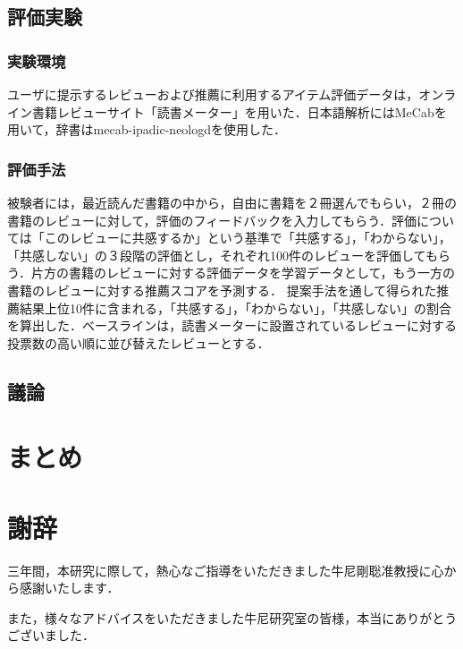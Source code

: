 \documentclass[a4paper,11pt,oneside,openany]{jsbook}
\begin{document}
	\section{評価実験}
		\subsection{実験環境}
ユーザに提示するレビューおよび推薦に利用するアイテム評価データは，オンライン書籍レビューサイト「読書メーター」を用いた．日本語解析にはMeCab\cite{mecab}を用いて，辞書はmecab-ipadic-neologd\cite{mecabdic}を使用した．

		\subsection{評価手法}
被験者には，最近読んだ書籍の中から，自由に書籍を２冊選んでもらい，２冊の書籍のレビューに対して，評価のフィードバックを入力してもらう．評価については「このレビューに共感するか」という基準で「共感する」，「わからない」，「共感しない」の３段階の評価とし，それぞれ100件のレビューを評価してもらう．片方の書籍のレビューに対する評価データを学習データとして，もう一方の書籍のレビューに対する推薦スコアを予測する．
提案手法を通して得られた推薦結果上位10件に含まれる，「共感する」，「わからない」，「共感しない」の割合を算出した．ベースラインは，読書メーターに設置されているレビューに対する投票数の高い順に並び替えたレビューとする．
	\section{議論}

\chapter{まとめ}

\chapter*{謝辞}
三年間，本研究に際して，熱心なご指導をいただきました牛尼剛聡准教授に心から感謝いたします．
\par
また，様々なアドバイスをいただきました牛尼研究室の皆様，本当にありがとうございました．
\end{document}
